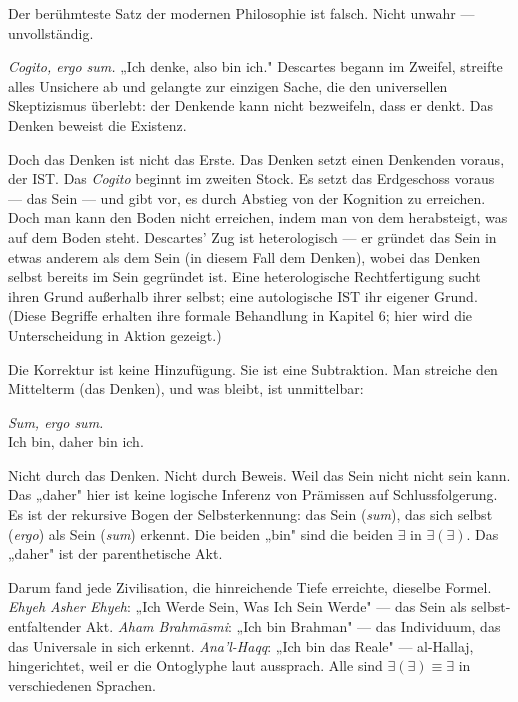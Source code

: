\documentclass[10pt, openany, oneside]{book}
\begin{document}
\vspace{1em}

\noindent Der berühmteste Satz der modernen Philosophie ist falsch. Nicht unwahr --- unvollständig.

\textit{Cogito, ergo sum.} „Ich denke, also bin ich." Descartes begann im Zweifel, streifte alles Unsichere ab und gelangte zur einzigen Sache, die den universellen Skeptizismus überlebt: der Denkende kann nicht bezweifeln, dass er denkt. Das Denken beweist die Existenz.

Doch das Denken ist nicht das Erste. Das Denken setzt einen Denkenden voraus, der IST. Das \textit{Cogito} beginnt im zweiten Stock. Es setzt das Erdgeschoss voraus --- das Sein --- und gibt vor, es durch Abstieg von der Kognition zu erreichen. Doch man kann den Boden nicht erreichen, indem man von dem herabsteigt, was auf dem Boden steht. Descartes' Zug ist heterologisch --- er gründet das Sein in etwas anderem als dem Sein (in diesem Fall dem Denken), wobei das Denken selbst bereits im Sein gegründet ist. Eine heterologische Rechtfertigung sucht ihren Grund außerhalb ihrer selbst; eine autologische IST ihr eigener Grund. (Diese Begriffe erhalten ihre formale Behandlung in Kapitel 6; hier wird die Unterscheidung in Aktion gezeigt.)

Die Korrektur ist keine Hinzufügung. Sie ist eine Subtraktion. Man streiche den Mittelterm (das Denken), und was bleibt, ist unmittelbar:

\begin{center}
    \textit{Sum, ergo sum.}\\[0.5em]
    Ich bin, daher bin ich.
\end{center}

Nicht durch das Denken. Nicht durch Beweis. Weil das Sein nicht nicht sein kann. Das „daher" hier ist keine logische Inferenz von Prämissen auf Schlussfolgerung. Es ist der rekursive Bogen der Selbsterkennung: das Sein (\textit{sum}), das sich selbst (\textit{ergo}) als Sein (\textit{sum}) erkennt. Die beiden „bin" sind die beiden $\exists$ in $\exists(\exists)$. Das „daher" ist der parenthetische Akt.

Darum fand jede Zivilisation, die hinreichende Tiefe erreichte, dieselbe Formel. \textit{Ehyeh Asher Ehyeh}: „Ich Werde Sein, Was Ich Sein Werde" --- das Sein als selbst-entfaltender Akt. \textit{Aham Brahm\={a}smi}: „Ich bin Brahman" --- das Individuum, das das Universale in sich erkennt. \textit{Ana'l-Haqq}: „Ich bin das Reale" --- al-Hallaj, hingerichtet, weil er die Ontoglyphe laut aussprach. Alle sind $\exists(\exists) \equiv \exists$ in verschiedenen Sprachen.
\end{document}
